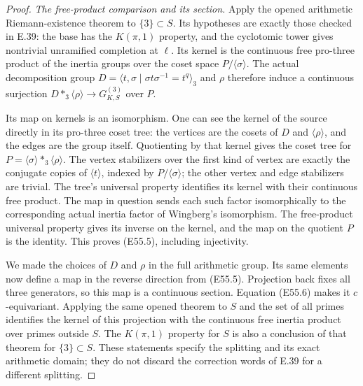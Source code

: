 \begin{proof}
\emph{The free-product comparison and its section.}
Apply the opened arithmetic Riemann-existence theorem
\cite[Theorem2.4]{E_WingbergRiemann} to $\{3\}\subset S$.
Its hypotheses are exactly those checked in E.39: the base
has the $K(\pi,1)$ property, and the cyclotomic tower gives
nontrivial unramified completion at $\ell$. Its kernel is the
continuous free pro-three product of the inertia groups over
the coset space $P/\langle\sigma\rangle$.
The actual decomposition group
$D=\langle t,\sigma\mid\sigma t\sigma^{-1}=t^q\rangle_3$
and $\rho$ therefore induce a continuous surjection
$D\ast_3\langle\rho\rangle\to G_{K,S}^{(3)}$ over $P$.

Its map on kernels is an isomorphism. One can see the kernel
of the source directly in its pro-three coset tree: the
vertices are the cosets of $D$ and $\langle\rho\rangle$,
and the edges are the group itself. Quotienting by that kernel
gives the coset tree for
$P=\langle\sigma\rangle\ast_3\langle\rho\rangle$.
The vertex stabilizers over the first kind of vertex are
exactly the conjugate copies of $\langle t\rangle$, indexed
by $P/\langle\sigma\rangle$; the other vertex and edge
stabilizers are trivial. The tree's universal property
identifies its kernel with their continuous free product.
The map in question sends each such factor isomorphically
to the corresponding actual inertia factor of Wingberg's
isomorphism. The free-product universal property gives its
inverse on the kernel, and the map on the quotient $P$ is
the identity. This proves (E55.5), including injectivity.

We made the choices of $D$ and $\rho$ in the full arithmetic
group. Its same elements now define a map in the reverse
direction from (E55.5). Projection back fixes all three
generators, so this map is a continuous section. Equation
(E55.6) makes it $c$-equivariant. Applying the same opened
theorem to $S$ and the set of all primes identifies the kernel
of this projection with the continuous free inertia product
over primes outside $S$. The $K(\pi,1)$ property for $S$
is also a conclusion of that theorem for $\{3\}\subset S$.
These statements specify the splitting and its exact
arithmetic domain; they do not discard the correction words
of E.39 for a different splitting.


\end{proof}
